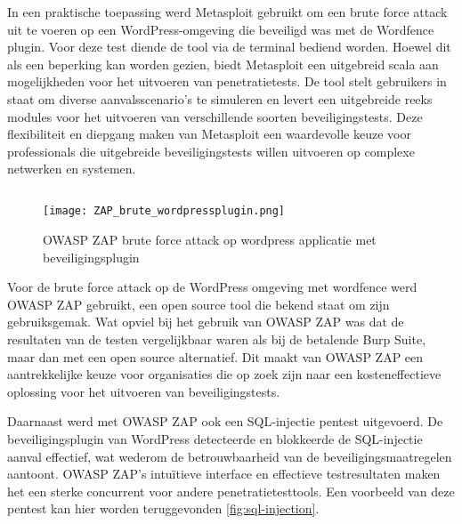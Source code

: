 In een praktische toepassing werd Metasploit gebruikt om een brute force attack uit te voeren op een WordPress-omgeving die beveiligd was met de Wordfence plugin. 
Voor deze test diende de tool via de terminal bediend worden. Hoewel dit als een beperking kan worden gezien, biedt Metasploit een uitgebreid scala aan 
mogelijkheden voor het uitvoeren van penetratietests. De tool stelt gebruikers in staat om diverse aanvalsscenario's te simuleren en levert een uitgebreide reeks 
modules voor het uitvoeren van verschillende soorten beveiligingstests. Deze flexibiliteit en diepgang maken van Metasploit een waardevolle keuze voor professionals die 
uitgebreide beveiligingstests willen uitvoeren op complexe netwerken en systemen.

\subsection{}
\begin{figure}
    \centering
    \texttt{[image: ZAP\_brute\_wordpressplugin.png]}
    \caption[OWASP ZAP brute force attack op wordpress applicatie met beveiligingsplugin]{OWASP ZAP brute force attack op wordpress applicatie met beveiligingsplugin}
\end{figure}

Voor de brute force attack op de WordPress omgeving met wordfence werd OWASP ZAP gebruikt, een open source tool die bekend staat om zijn gebruiksgemak. 
Wat opviel bij het gebruik van OWASP ZAP was dat de resultaten van de testen vergelijkbaar waren als bij de betalende Burp Suite, maar dan met een open source alternatief. 
Dit maakt van OWASP ZAP een aantrekkelijke keuze voor organisaties die op zoek zijn naar een kosteneffectieve oplossing voor het uitvoeren van beveiligingstests.

Daarnaast werd met OWASP ZAP ook een SQL-injectie pentest uitgevoerd. De beveiligingsplugin van WordPress detecteerde en blokkeerde de SQL-injectie aanval effectief, 
wat wederom de betrouwbaarheid van de beveiligingsmaatregelen aantoont. OWASP ZAP's intuïtieve interface en effectieve testresultaten maken het een sterke concurrent 
voor andere penetratietesttools. Een voorbeeld van deze pentest kan hier worden teruggevonden \ref{fig:sql-injection}.

\section{}
